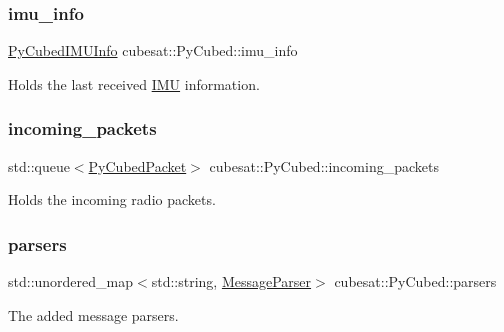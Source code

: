 \subsubsection{\texorpdfstring{imu\+\_\+info}{imu\_info}}
{\footnotesize\ttfamily \hyperlink{structcubesat_1_1PyCubedIMUInfo}{Py\+Cubed\+I\+M\+U\+Info} cubesat\+::\+Py\+Cubed\+::imu\+\_\+info\hspace{0.3cm}{\ttfamily [private]}}



Holds the last received \hyperlink{classcubesat_1_1IMU}{I\+MU} information. 

\mbox{\label{classcubesat_1_1PyCubed_a909673179f44b10128f01bd579bc13ba}} 
\subsubsection{\texorpdfstring{incoming\+\_\+packets}{incoming\_packets}}
{\footnotesize\ttfamily std\+::queue$<$\hyperlink{structcubesat_1_1PyCubedPacket}{Py\+Cubed\+Packet}$>$ cubesat\+::\+Py\+Cubed\+::incoming\+\_\+packets\hspace{0.3cm}{\ttfamily [private]}}



Holds the incoming radio packets. 

\mbox{\label{classcubesat_1_1PyCubed_a284d1cfcdd19675e2b96913018192928}} 
\subsubsection{\texorpdfstring{parsers}{parsers}}
{\footnotesize\ttfamily std\+::unordered\+\_\+map$<$std\+::string, \hyperlink{structcubesat_1_1PyCubed_1_1MessageParser}{Message\+Parser}$>$ cubesat\+::\+Py\+Cubed\+::parsers\hspace{0.3cm}{\ttfamily [private]}}



The added message parsers. 

\mbox{\label{classcubesat_1_1PyCubed_ac1feae4409faf165aafdc38489918db3}} 
